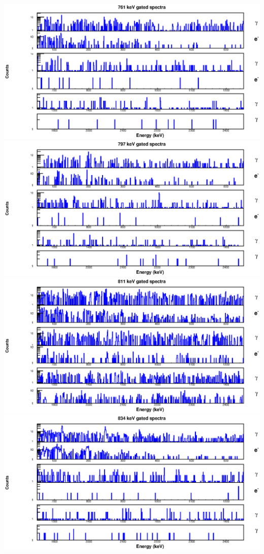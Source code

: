 \begin{landscape}
\includegraphics[scale=1.2]{154Gd_Appendix/761_combined.eps}
\includegraphics[scale=1.2]{154Gd_Appendix/797_combined.eps}
\includegraphics[scale=1.2]{154Gd_Appendix/811_combined.eps}
\includegraphics[scale=1.2]{154Gd_Appendix/834_combined.eps}

\end{landscape}
